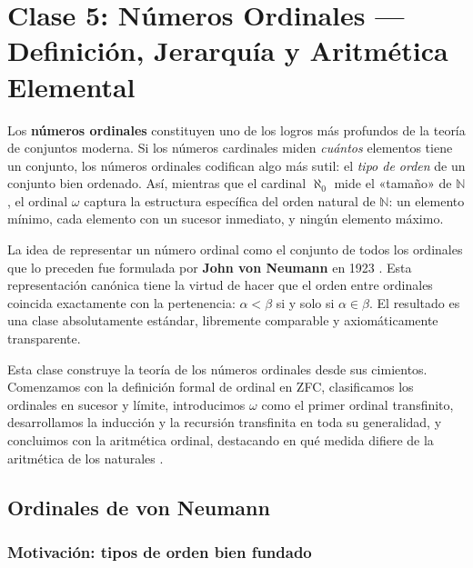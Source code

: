 \chapter{Clase 5: Números Ordinales — Definición, Jerarquía y Aritmética Elemental}

Los \textbf{números ordinales} constituyen uno de los logros más profundos de la teoría de conjuntos moderna. Si los números cardinales miden \emph{cuántos} elementos tiene un conjunto, los números ordinales codifican algo más sutil: el \emph{tipo de orden} de un conjunto bien ordenado. Así, mientras que el cardinal $\aleph_0$ mide el «tamaño» de $\mathbb{N}$, el ordinal $\omega$ captura la estructura específica del orden natural de $\mathbb{N}$: un elemento mínimo, cada elemento con un sucesor inmediato, y ningún elemento máximo.

La idea de representar un número ordinal como el conjunto de todos los ordinales que lo preceden fue formulada por \textbf{John von Neumann} en 1923 \cite{vonneumann1923}. Esta representación canónica tiene la virtud de hacer que el orden entre ordinales coincida exactamente con la pertenencia: $\alpha < \beta$ si y solo si $\alpha \in \beta$. El resultado es una clase absolutamente estándar, libremente comparable y axiomáticamente transparente.

Esta clase construye la teoría de los números ordinales desde sus cimientos. Comenzamos con la definición formal de ordinal en ZFC, clasificamos los ordinales en sucesor y límite, introducimos $\omega$ como el primer ordinal transfinito, desarrollamos la inducción y la recursión transfinita en toda su generalidad, y concluimos con la aritmética ordinal, destacando en qué medida difiere de la aritmética de los naturales \cite{jech2003, kunen2011, enderton1977, hrbacek1999}.

\section{Ordinales de von Neumann}

\subsection{Motivación: tipos de orden bien fundado}

